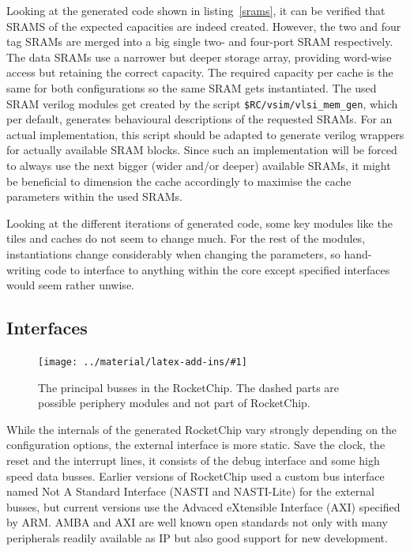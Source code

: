 \documentclass[journal,a4paper]{IEEEtran}
\newcommand*{\COMPILEIMAGES}{}%
\newcommand\inputimage[1]{%
	\ifdefined\COMPILEIMAGES
		
	\else
		\texttt{[image: ../material/latex-add-ins/\#1]}
	\fi
}
\begin{document}
Looking at the generated code shown in listing~\ref{srams}, it can be verified that SRAMS of the expected capacities are indeed created.
However, the two and four tag SRAMs are merged into a big single two- and four-port SRAM respectively.
The data SRAMs use a narrower but deeper storage array, providing word-wise access but retaining the correct capacity. The required capacity per cache is the same for both configurations so the same SRAM gets instantiated.
The used SRAM verilog modules get created by the script \texttt{\$RC/vsim/vlsi\_mem\_gen}, which per default, generates behavioural descriptions of the requested SRAMs.
For an actual implementation, this script should be adapted to generate verilog wrappers for actually available SRAM blocks.
Since such an implementation will be forced to always use the next bigger (wider and/or deeper) available SRAMs, it might be beneficial to dimension the cache accordingly to maximise the cache parameters within the used SRAMs.

Looking at the different iterations of generated code, some key modules like the tiles and caches do not seem to change much.
For the rest of the modules, instantiations change considerably when changing the parameters, so hand-writing code to interface to anything within the core except specified interfaces would seem rather unwise.

\subsection{Interfaces}

\begin{figure}%
	\centering
	\inputimage{image4}
	\caption{The principal busses in the RocketChip. The dashed parts are possible periphery modules and not part of RocketChip.}
	\label{busses}
\end{figure}
While the internals of the generated RocketChip vary strongly depending on the configuration options, the external interface is more static.
Save the clock, the reset and the interrupt lines, it consists of the debug interface and some high speed data busses.
Earlier versions of RocketChip used a custom bus interface named Not A Standard Interface (NASTI and NASTI-Lite) for the external busses, but current versions use the Advaced eXtensible Interface (AXI) specified by ARM\cite{axi}.
AMBA and AXI are well known open standards not only with many peripherals readily available as IP but also good support for new development\cite{axi-tools}.
\end{document}
